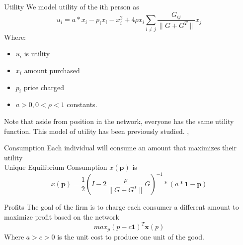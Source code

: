\documentclass[11pt]{beamer}
\newcommand\<{\langle}
\renewcommand\>{\rangle}
\newcommand\inv{^{-1}}
\renewcommand{\v}[1]{\textbf{#1}}
\begin{document}
\begin{frame}{Utility}
  We model utility of the ith person as
  $$ u_{i} = a*x_{i} - p_{i}x_{i} - x_{i}^{2} + 4\rho x_{i}\sum_{i \neq j} \frac{G_{ij}}{\| G + G^{T}\|} x_{j} $$
  Where:
  \begin{itemize}
    \item $u_{i}$ is utility \\
    \item $x_{i}$ amount purchased \\
    \item $p_{i}$ price charged \\
    \item $a > 0, 0 < \rho < 1$  constants. \\
  \end{itemize}
  Note that aside from position in the network, everyone has the same utility function.
This model of utility has been previously studied. \cite{huang2022value}, \cite{candogan2012optimal} \cite{fainmesser2016pricing} \cite{bloch2013pricing}
\end{frame}

\begin{frame}{Consumption}
  Each individual will consume an amount that maximizes their utility\\
  Unique Equilibrium Consumption $x(\v{p})$ is
  $$ x(\v{p}) = \frac{1}{2} \left( I - 2 \frac{\rho}{\|G + G^{T}\|} G \right) \inv  * (a*\v{1} - \v{p})$$\cite{candogan2012optimal}
\end{frame}


\begin{frame}{Profits}
  The goal of the firm is to charge each consumer a different amount to maximize profit based on the network \\
  $$max_{p} (p - c\v{1})^{T} \v{x}(p)$$
  Where $a > c > 0$ is the unit cost to produce one unit of the good.
\end{frame}
\end{document}
